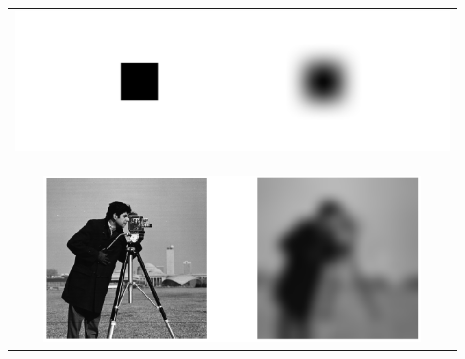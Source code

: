 \documentclass{standalone}
\begin{document}
\begin{tabular}{c}
	\includegraphics[width=11.5cm]{pix_ges.png}\\
	\hspace{0.07cm}\\
	\\
	\\
	\includegraphics[width=10cm]{pic.png}
\end{tabular}
\end{document}
